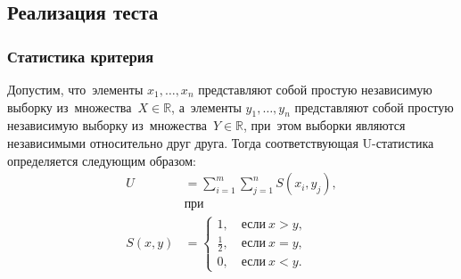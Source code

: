 \documentclass[]{scrartcl}
\begin{document}
\subsection{Реализация теста}
\subsubsection{Статистика критерия}
Допустим, что~элементы ${\textstyle x_{1},\ldots,x_{n}}$ представляют собой простую независимую выборку из~множества~${\textstyle X \in \mathbb{R}}$, а~элементы ${\textstyle y_{1},\ldots,y_{n}}$ представляют собой простую независимую выборку из~множества~${\textstyle Y \in \mathbb{R}}$, при~этом выборки являются независимыми относительно друг друга. Тогда соответствующая U-статистика определяется следующим образом:
\begin{equation}\label{eq:U-statistic-base-formula}
	\begin{aligned}
	U&=\sum_{i=1}^{m} \sum_{j=1}^{n} S (x_{i},y_{j}),\\
	&\text{при}\\
	S(x,y)&=
	\begin{cases}
	1,\quad \text{если}\ x>y,\\
	\frac{1}{2},\quad \text{если}\ x=y,\\
	0,\quad \text{если}\ x<y.
	\end{cases}
	\end{aligned}
\end{equation}
\end{document}
